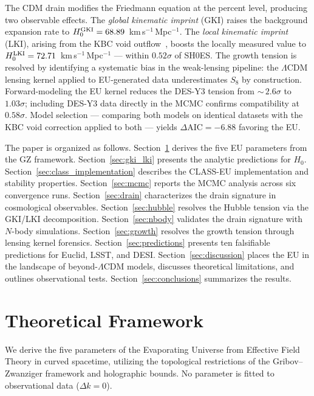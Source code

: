 \documentclass[a4paper,fleqn]{cas-dc}
\begin{document}
The CDM drain modifies the Friedmann equation at the
percent level, producing two observable effects.
The \textit{global kinematic imprint} (GKI) raises the
background expansion rate to
$H_0^{\rm GKI} = 68.89$~km\,s$^{-1}$\,Mpc$^{-1}$.
The \textit{local kinematic imprint} (LKI), arising from
the KBC void outflow~\cite{keenan2013,wu_huterer2017},
boosts the locally measured value to
$H_0^{\rm LKI} = 72.71$~km\,s$^{-1}$\,Mpc$^{-1}$
--- within $0.52\sigma$ of SH0ES.
The growth tension is resolved by identifying a
systematic bias in the weak-lensing pipeline: the
$\Lambda$CDM lensing kernel applied to EU-generated
data underestimates $S_8$ by construction.
Forward-modeling the EU kernel reduces the DES-Y3
tension from ${\sim}\,2.6\sigma$ to $1.03\sigma$; including
DES-Y3 data directly in the MCMC confirms compatibility
at $0.58\sigma$.
Model selection --- comparing both models on identical
datasets with the KBC void correction applied to
both --- yields $\Delta\text{AIC} = -6.88$ favoring the EU.

The paper is organized as follows.
Section~\ref{sec:theory} derives the five EU parameters
from the GZ framework.
Section~\ref{sec:gki_lki} presents the
analytic predictions for $H_0$.
Section~\ref{sec:class_implementation} describes the
CLASS-EU implementation and stability properties.
Section~\ref{sec:mcmc} reports the
MCMC analysis across six convergence runs.
Section~\ref{sec:drain} characterizes the drain
signature in cosmological observables.
Section~\ref{sec:hubble} resolves the Hubble tension
via the GKI/LKI decomposition.
Section~\ref{sec:nbody} validates the drain signature
with $N$-body simulations.
Section~\ref{sec:growth} resolves the growth
tension through lensing kernel forensics.
Section~\ref{sec:predictions} presents ten falsifiable
predictions for Euclid, LSST, and DESI.
Section~\ref{sec:discussion} places the EU in the
landscape of beyond-$\Lambda$CDM models, discusses
theoretical limitations, and outlines observational
tests. Section~\ref{sec:conclusions} summarizes
the results.

\section{Theoretical Framework}
\label{sec:theory}

We derive the five parameters of the Evaporating Universe from
Effective Field Theory in curved spacetime, utilizing the topological
restrictions of the Gribov--Zwanziger framework and holographic bounds.
No parameter is fitted to observational data ($\Delta k = 0$).
\end{document}
